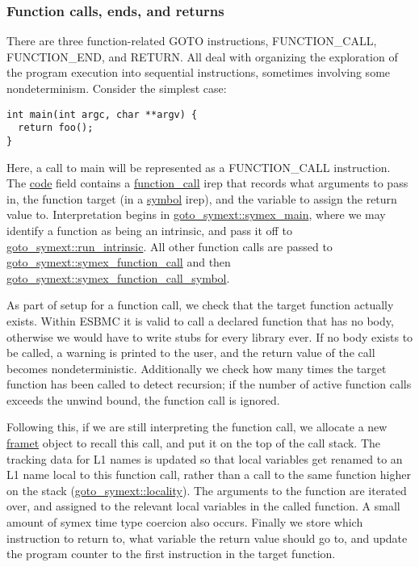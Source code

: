 \documentclass{article}
\begin{document}
\subsubsection{Function calls, ends, and returns}

There are three function-related GOTO instructions, FUNCTION\_CALL,
FUNCTION\_END, and RETURN. All deal with organizing the exploration of
the program execution into sequential instructions, sometimes involving
some nondeterminism. Consider the simplest case:

\begin{lstlisting}
int main(int argc, char **argv) {
  return foo();
}
\end{lstlisting}

Here, a call to main will be represented as a FUNCTION\_CALL instruction.
The \url{code} field contains a \url{function_call} irep that
records what arguments to pass in, the function target (in a \url{symbol}
irep), and the variable to assign the return value to. Interpretation begins
in \url{goto_symext::symex_main}, where we may identify a function as
being an intrinsic, and pass it off to \url{goto_symext::run_intrinsic}.
All other function calls are passed to
\url{goto_symext::symex_function_call} and then
\url{goto_symext::symex_function_call_symbol}.

As part of setup for a function call, we check that the target function
actually exists. Within ESBMC it is valid to call a declared function that has
no body, otherwise we would have to write stubs for every library ever. If no
body exists to be called, a warning is printed to the user, and the return value
of the call becomes nondeterministic. Additionally we check how many times
the target function has been called to detect recursion; if the number of
active function calls exceeds the unwind bound, the function call is ignored.

Following this, if we are still interpreting the function call, we allocate a
new \url{framet} object to recall this call, and put it on the top of the
call stack. The tracking data for L1 names is updated so that local variables
get renamed to an L1 name local to this function call, rather than a call to
the same function higher on the stack (\url{goto_symext::locality}).
The arguments to the function are iterated over, and assigned to the relevant
local variables in the called function. A small amount of symex time type
coercion also occurs. Finally we store which instruction to return to, what
variable the return value should go to, and update the program counter to the
first instruction in the target function.
\end{document}
